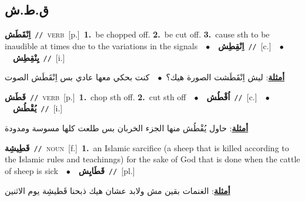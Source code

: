 \documentclass[10pt,a4paper,twoside]{article} %
\begin{document}
\begin{multicols}{2}
\vspace{-3mm}
\subsection*{\color{blue}\foreignlanguage{arabic}{ق.ط.ش}\color{blue}{}} 

{\setlength\topsep{0pt}\textbf{\foreignlanguage{arabic}{اِنْقَطَش}}\ {\color{gray}\texttt{//}\color{black}}\ \textsc{verb}\ [p.]\ \textbf{1.}~be chopped off.  \textbf{2.}~be cut off.  \textbf{3.}~cause sth to be inaudible at times due to the variations in the signals\ \ $\bullet$\ \ \setlength\topsep{0pt}\textbf{\foreignlanguage{arabic}{اِنْقِطِش}}\ {\color{gray}\texttt{//}\color{black}}\ [c.]\ \ $\bullet$\ \ \setlength\topsep{0pt}\textbf{\foreignlanguage{arabic}{يِنْقِطِش}}\ {\color{gray}\texttt{//}\color{black}}\ [i.]\  \begin{flushright}\color{gray}\foreignlanguage{arabic}{\textbf{\underline{\foreignlanguage{arabic}{أمثلة}}}: ليش اِنْقَطَشت الصورة هيك؟\ $\bullet$\ \  كنت بحكي معها عادي بس اِنْقَطَش الصوت}\end{flushright}\color{black}} \vspace{2mm}

{\setlength\topsep{0pt}\textbf{\foreignlanguage{arabic}{قَطَش}}\ {\color{gray}\texttt{//}\color{black}}\ \textsc{verb}\ [p.]\ \textbf{1.}~chop sth off.  \textbf{2.}~cut sth off\ \ $\bullet$\ \ \setlength\topsep{0pt}\textbf{\foreignlanguage{arabic}{اُقْطُش}}\ {\color{gray}\texttt{//}\color{black}}\ [c.]\ \ $\bullet$\ \ \setlength\topsep{0pt}\textbf{\foreignlanguage{arabic}{يُقْطُش}}\ {\color{gray}\texttt{//}\color{black}}\ [i.]\  \begin{flushright}\color{gray}\foreignlanguage{arabic}{\textbf{\underline{\foreignlanguage{arabic}{أمثلة}}}: حاول يُقْطُش منها الجزء الخربان بس طلعت كلها مسوسة ومدودة}\end{flushright}\color{black}} \vspace{2mm}

{\setlength\topsep{0pt}\textbf{\foreignlanguage{arabic}{قَطِيشِة}}\ {\color{gray}\texttt{//}\color{black}}\ \textsc{noun}\ [f.]\ \textbf{1.}~an Islamic sarcifice (a sheep that is killed according to the Islamic rules and teachinngs) for the sake of God  that is done when the cattle of sheep is sick\ \ $\bullet$\ \ \setlength\topsep{0pt}\textbf{\foreignlanguage{arabic}{قَطَايِش}}\ {\color{gray}\texttt{//}\color{black}}\ [pl.]\  \begin{flushright}\color{gray}\foreignlanguage{arabic}{\textbf{\underline{\foreignlanguage{arabic}{أمثلة}}}: الغنمات بقين مش ولابد عشان هيك ذبحنا قَطيشِة يوم الاثنين}\end{flushright}\color{black}} \vspace{2mm}


\end{multicols}
\end{document}
